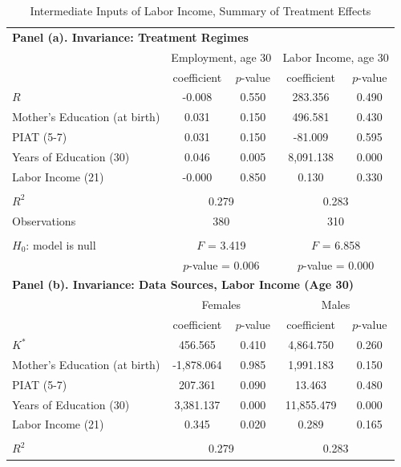 \begin{table}[!htpb]
\begin{threeparttable}
\caption{Intermediate Inputs of Labor Income, Summary of Treatment Effects} \label{table:invariance}
\centering
\begin{tabular}{lcccc} \toprule
 \multicolumn{5}{l}{\textbf{Panel (a). Invariance: Treatment Regimes}} \\
       & \multicolumn{2}{c}{Employment, age 30} &   \multicolumn{2}{c}{Labor Income, age 30} \\
       			      & coefficient & $p$-value & coefficient & $p$-value \\
$R$ &-0.008 & 0.550 & 283.356 & 0.490 \\
Mother's Education (at birth) & 0.031 & 0.150 & 496.581 & 0.430 \\
PIAT (5-7) & 0.031 & 0.150 & -81.009 & 0.595 \\
Years of Education (30) & 0.046 & 0.005 & 8,091.138 & 0.000 \\
Labor Income (21) & -0.000 & 0.850 & 0.130 & 0.330 \\ \\
$R^2$ & \multicolumn{2}{c}{0.279}  & \multicolumn{2}{c}{0.283}  \\
Observations & \multicolumn{2}{c}{380} & \multicolumn{2}{c}{310} \\ \\
$H_0$: model is null & \multicolumn{2}{c}{$F$ = 3.419} & \multicolumn{2}{c}{$F$ = 6.858} \\
& \multicolumn{2}{c}{$p$-value = 0.006} & \multicolumn{2}{c}{$p$-value = 0.000} \\ \midrule
 \multicolumn{5}{l}{\textbf{Panel (b). Invariance: Data Sources, Labor Income (Age 30)}} \\
       & \multicolumn{2}{c}{Females} &   \multicolumn{2}{c}{Males} \\
       			      & coefficient & $p$-value & coefficient & $p$-value \\
$K^*$ & 456.565 & 0.410  & 4,864.750 & 0.260 \\
Mother's Education (at birth) & -1,878.064 & 0.985  & 1,991.183 & 0.150 \\
PIAT (5-7) & 207.361 & 0.090 & 13.463 & 0.480 \\
Years of Education (30) & 3,381.137 & 0.000 & 11,855.479 & 0.000 \\
Labor Income (21) & 0.345 & 0.020 & 0.289 & 0.165 \\ \\
$R^2$ & \multicolumn{2}{c}{0.279}  & \multicolumn{2}{c}{0.283}  \\

\end{tabular}
\end{threeparttable}
\end{table}
